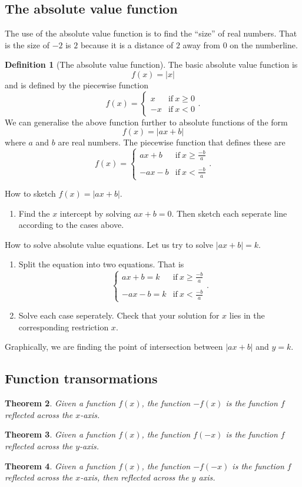 \documentclass[12pt]{book}
\newtheorem{theo}{Theorem}[section]
\theoremstyle{definition}
\newtheorem{defi}[theo]{Definition}
\begin{document}
\subsection{The absolute value function}
  The use of the absolute value function is to find the ``size'' of real numbers. That is the size of $-2$ is $2$ because it
  is a distance of $2$ away from $0$ on the numberline.
  \begin{defi}[The absolute value function]
    The basic absolute value function is \[f(x)=|x|\] and is defined by the piecewise function
    \[f(x)=\begin{cases}x &\text{if}\ x\geq 0\\-x &\text{if}\ x<0\end{cases}.\]
    We can generalise the above function further to absolute functions of the form
    \[f(x)=|ax+b|\]
    where $a$ and $b$ are real numbers. The piecewise function that defines these are
    \[f(x)=\begin{cases}ax+b &\text{if}\ x\geq \frac{-b}{a}\\ \\ -ax-b &\text{if}\ x<\frac{-b}{a}\end{cases}.\]
  \end{defi}
  \noindent How to sketch $f(x)=|ax+b|$.
  \begin{enumerate}
    \item Find the $x$ intercept by solving $ax+b=0$. Then sketch each seperate line according to the cases above.
  \end{enumerate}
  How to solve absolute value equations. Let us try to solve $|ax+b|=k$.
  \begin{enumerate}
    \item Split the equation into two equations. That is
      \[\begin{cases}ax+b=k &\text{if}\ x\geq \frac{-b}{a}\\ \\ -ax-b=k &\text{if}\ x<\frac{-b}{a}\end{cases}.\]
    \item Solve each case seperately. Check that your solution for $x$ lies in the corresponding restriction $x$.
  \end{enumerate}
  Graphically, we are finding the point of intersection between $|ax+b|$ and $y=k$.
\subsection{Function transormations}
  \begin{theo}
    Given a function $f(x)$, the function $-f(x)$ is the function $f$ reflected across the $x$-axis.
  \end{theo}
  \begin{theo}
    Given a function $f(x)$, the function $f(-x)$ is the function $f$ reflected across the $y$-axis.
  \end{theo}
  \begin{theo}
    Given a function $f(x)$, the function $-f(-x)$ is the function $f$ reflected across the $x$-axis, then reflected
    across the $y$ axis.
  \end{theo}
\end{document}
